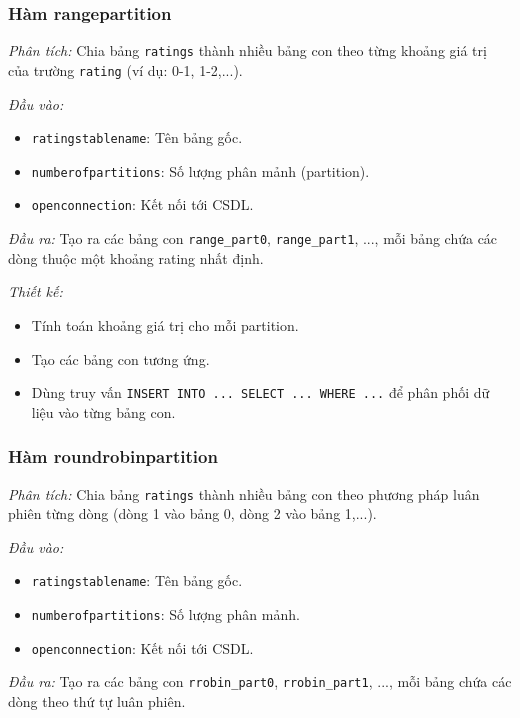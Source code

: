 \documentclass[14pt]{extarticle}
\begin{document}
\subsubsection{Hàm rangepartition}

\textit{Phân tích:}  
Chia bảng \texttt{ratings} thành nhiều bảng con theo từng khoảng giá trị của trường \texttt{rating} (ví dụ: 0-1, 1-2,...).

\textit{Đầu vào:}
\begin{itemize}
    \item \texttt{ratingstablename}: Tên bảng gốc.
    \item \texttt{numberofpartitions}: Số lượng phân mảnh (partition).
    \item \texttt{openconnection}: Kết nối tới CSDL.
\end{itemize}

\textit{Đầu ra:}  
Tạo ra các bảng con \texttt{range\_part0}, \texttt{range\_part1}, ..., mỗi bảng chứa các dòng thuộc một khoảng rating nhất định.

\textit{Thiết kế:}
\begin{itemize}
    \item Tính toán khoảng giá trị cho mỗi partition.
    \item Tạo các bảng con tương ứng.
    \item Dùng truy vấn \texttt{INSERT INTO ... SELECT ... WHERE ...} để phân phối dữ liệu vào từng bảng con.
\end{itemize}


\subsubsection{Hàm roundrobinpartition}

\textit{Phân tích:}  
Chia bảng \texttt{ratings} thành nhiều bảng con theo phương pháp luân phiên từng dòng (dòng 1 vào bảng 0, dòng 2 vào bảng 1,...).

\textit{Đầu vào:}
\begin{itemize}
    \item \texttt{ratingstablename}: Tên bảng gốc.
    \item \texttt{numberofpartitions}: Số lượng phân mảnh.
    \item \texttt{openconnection}: Kết nối tới CSDL.
\end{itemize}

\textit{Đầu ra:}  
Tạo ra các bảng con \texttt{rrobin\_part0}, \texttt{rrobin\_part1}, ..., mỗi bảng chứa các dòng theo thứ tự luân phiên.
\end{document}
